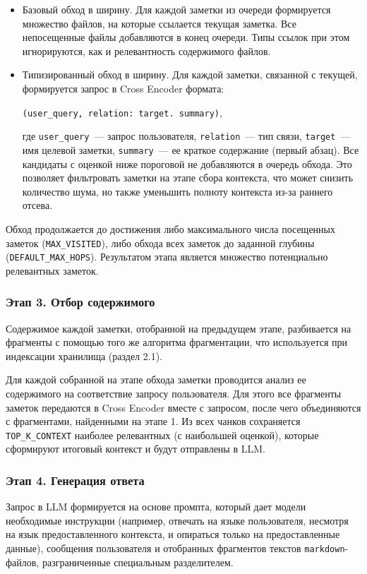 \begin{itemize}
      \item Базовый обход в ширину. Для каждой заметки из очереди формируется множество файлов,
            на которые ссылается текущая заметка.
            Все непосещенные файлы добавляются в конец очереди.
            Типы ссылок при этом игнорируются, как и релевантность содержимого файлов.
      \item Типизированный обход в ширину. Для каждой заметки, связанной с текущей,
            формируется запрос в Cross Encoder формата:
            \begin{center}
                  \texttt{(user\_query, relation: target. summary)},
            \end{center}
            где \texttt{user\_query}~--- запрос пользователя,
            \texttt{relation}~--- тип связи, \texttt{target}~--- имя целевой заметки,
            \texttt{summary}~--- ее краткое содержание (первый абзац).
            Все кандидаты с оценкой ниже пороговой не добавляются в очередь обхода.
            Это позволяет фильтровать заметки на этапе сбора контекста, что
            может снизить количество шума, но также уменьшить полноту контекста из-за раннего отсева.
\end{itemize}

Обход продолжается до достижения либо максимального числа посещенных заметок (\texttt{MAX\_VISITED}),
либо обхода всех заметок до заданной глубины (\texttt{DEFAULT\_MAX\_HOPS}).
Результатом этапа является множество потенциально релевантных заметок.

\subsubsection*{Этап 3. Отбор содержимого}
Содержимое каждой заметки, отобранной на предыдущем этапе, разбивается на фрагменты
с помощью того же алгоритма фрагментации, что используется при индексации хранилища (раздел 2.1).

Для каждой собранной на этапе обхода заметки
проводится анализ ее содержимого на соответствие запросу пользователя.
Для этого все фрагменты заметок
передаются в Cross Encoder вместе с запросом,
после чего объединяются с фрагментами,
найденными на этапе 1.
Из всех чанков сохраняется \texttt{TOP\_K\_CONTEXT}
наиболее релевантных (с наибольшей оценкой),
которые сформируют итоговый контекст и будут отправлены в LLM.

\subsubsection*{Этап 4. Генерация ответа}
Запрос в LLM формируется на основе промпта, который дает модели необходимые инструкции
(например, отвечать на языке пользователя, несмотря на язык предоставленного контекста,
и опираться только на предоставленные данные),
сообщения пользователя и
отобранных фрагментов текстов \texttt{markdown}-файлов,
разграниченные специальным разделителем.

